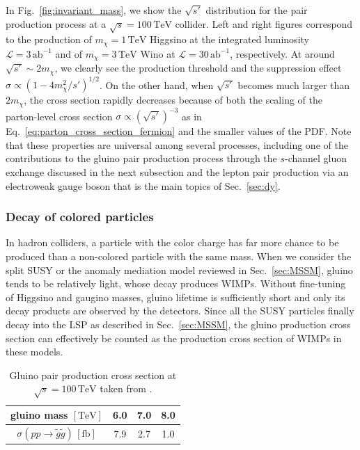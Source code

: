 \documentclass[12pt,twoside,book]{article}
\begin{document}
In Fig.~\ref{fig:invariant_mass}, we show the $\sqrt{s'}$ distribution for the pair production process at a $\sqrt{s} = 100\,\mathrm{TeV}$ collider.
Left and right figures correspond to the production of $m_\chi = 1\,\mathrm{TeV}$ Higgsino at the integrated luminosity $\mathcal{L} = 3\,\mathrm{ab}^{-1}$ and of $m_\chi = 3\,\mathrm{TeV}$ Wino at $\mathcal{L} = 30\,\mathrm{ab}^{-1}$, respectively.
At around $\sqrt{s'} \sim 2 m_\chi$, we clearly see the production threshold and the suppression effect $\sigma \propto (1-4 m_\chi^2 / s')^{1/2}$.
On the other hand, when $\sqrt{s'}$ becomes much larger than $2m_\chi$, the cross section rapidly decreases because of both the scaling of the parton-level cross section $\sigma \propto (\sqrt{s'})^{-3}$ as in Eq.~\eqref{eq:parton_cross_section_fermion} and the smaller values of the PDF.
Note that these properties are universal among several processes, including one of the contributions to the gluino pair production process through the $s$-channel gluon exchange discussed in the next subsection and the lepton pair production via an electroweak gauge boson that is the main topics of Sec.~\ref{sec:dy}.


\subsubsection*{Decay of colored particles}

In hadron colliders, a particle with the color charge has far more chance to be produced than a non-colored particle with the same mass.
When we consider the split SUSY or the anomaly mediation model reviewed in Sec.~\ref{sec:MSSM}, gluino tends to be relatively light, whose decay produces WIMPs.
Without fine-tuning of Higgsino and gaugino masses, gluino lifetime is sufficiently short and only its decay products are observed by the detectors.
Since all the SUSY particles finally decay into the LSP as described in Sec.~\ref{sec:MSSM}, the gluino production cross section can effectively be counted as the production cross section of WIMPs in these models.

\begin{table}[t]
  \centering
  \begin{tabular}{c|ccc}
    gluino mass $\mathrm{[TeV]}$ & 6.0 & 7.0 & 8.0 \\ \hline
    $\sigma(p p \to \tilde{g} \tilde{g})\, \mathrm{[fb]}$ & 7.9 & 2.7 & 1.0
  \end{tabular}
  \caption{Gluino pair production cross section at $\sqrt{s} = 100\,\mathrm{TeV}$ taken from \cite{Asai:2019wst}.}
  \label{tab:gluino_pair}
\end{table}
\end{document}
